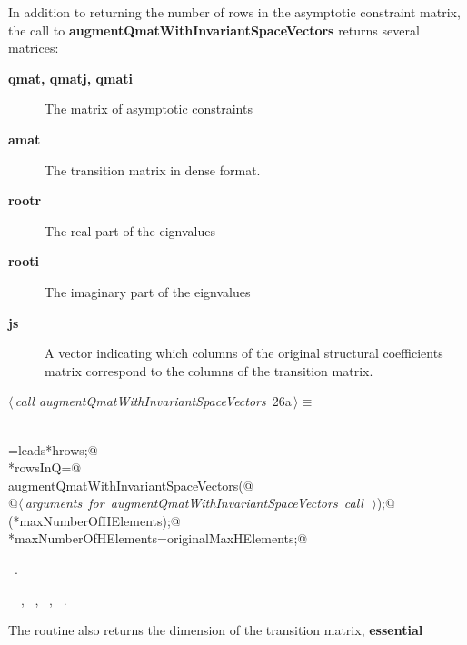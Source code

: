 \documentclass{article}
\begin{document}
In addition to returning the number of rows in the asymptotic
constraint matrix, the call to 
{\bf augmentQmatWithInvariantSpaceVectors } returns several matrices:
\begin{description}
\item[{\bf qmat, qmatj, qmati}] The matrix of asymptotic constraints
\item[{\bf amat}]The transition matrix in dense format.
\item[{\bf rootr }] The real part of the eignvalues
\item[{\bf rooti }] The imaginary part of the eignvalues
\item[{\bf js}] A vector indicating which columns of the original structural
coefficients matrix correspond to the columns of the transition matrix.
\end{description}

\begin{flushleft} \small
\begin{minipage}{\linewidth}\label{scrap25}\raggedright\small
{} $\langle\,${\itshape call augmentQmatWithInvariantSpaceVectors}\nobreak\ {\footnotesize {26a}}$\,\rangle\equiv$
\vspace{-1ex}
\begin{list}{}{} \item
\mbox{}\verb@@\\
\mbox{}\verb@constraintsNeeded=leads*hrows;@\\
\mbox{}\verb@*rowsInQ=@\\
\mbox{}\verb@    augmentQmatWithInvariantSpaceVectors(@\\
\mbox{}\verb@      @\hbox{$\langle\,${\itshape arguments for augmentQmatWithInvariantSpaceVectors call}\nobreak\ {\footnotesize {}}$\,\rangle$}\verb@);@\\
\mbox{}\verb@bumpSparseAim(*maxNumberOfHElements);@\\
\mbox{}\verb@*maxNumberOfHElements=originalMaxHElements;@\\
\mbox{}\verb@@{\NWsep}
\end{list}
\vspace{-1.5ex}
\footnotesize
\begin{list}{}{\setlength{\itemsep}{-\parsep}\setlength{\itemindent}{-\leftmargin}}
\item \NWtxtMacroRefIn\ .
\item \NWtxtIdentsUsed\nobreak\  \verb@bumpSparseAim@\nobreak\ , \verb@hrows@\nobreak\ , \verb@maxNumberOfHElements@\nobreak\ , \verb@rowsInQ@\nobreak\ .
\item{}
\end{list}
\end{minipage}\vspace{4ex}
\end{flushleft}
The routine also returns the dimension of the transition matrix, {\bf essential}
\end{document}
